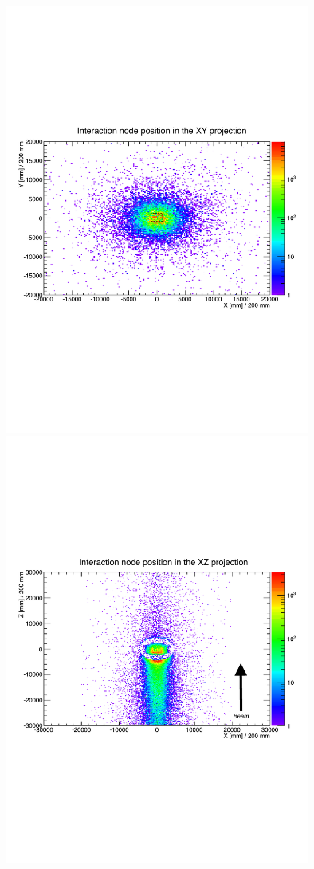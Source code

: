 \begin{figure}
\begin{center}
  	\includegraphics[width=100mm]{Chapter4/figures/rockPositionOrigin_XY_copy.pdf}\\
  	\includegraphics[width=100mm]{Chapter4/figures/rockPositionOrigin_XZ_copy.pdf}\\

\end{center}
\end{figure}
